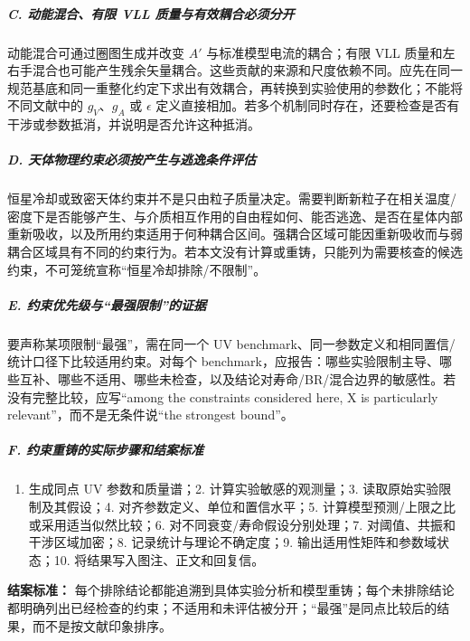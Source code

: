 \documentclass[
]{article}
\providecommand{\tightlist}{%
  \setlength{\itemsep}{0pt}\setlength{\parskip}{0pt}}
\begin{document}
\subparagraph{C. 动能混合、有限 VLL
质量与有效耦合必须分开}\label{c.-ux52a8ux80fdux6df7ux5408ux6709ux9650-vll-ux8d28ux91cfux4e0eux6709ux6548ux8026ux5408ux5fc5ux987bux5206ux5f00}

动能混合可通过圈图生成并改变 \(A'\) 与标准模型电流的耦合；有限 VLL
质量和左右手混合也可能产生残余矢量耦合。这些贡献的来源和尺度依赖不同。应先在同一规范基底和同一重整化约定下求出有效耦合，再转换到实验使用的参数化；不能将不同文献中的
\(g_V\)、\(g_A\) 或 \(\epsilon\)
定义直接相加。若多个机制同时存在，还要检查是否有干涉或参数抵消，并说明是否允许这种抵消。

\subparagraph{D.
天体物理约束必须按产生与逃逸条件评估}\label{d.-ux5929ux4f53ux7269ux7406ux7ea6ux675fux5fc5ux987bux6309ux4ea7ux751fux4e0eux9003ux9038ux6761ux4ef6ux8bc4ux4f30}

恒星冷却或致密天体约束并不是只由粒子质量决定。需要判断新粒子在相关温度/密度下是否能够产生、与介质相互作用的自由程如何、能否逃逸、是否在星体内部重新吸收，以及所用约束适用于何种耦合区间。强耦合区域可能因重新吸收而与弱耦合区域具有不同的约束行为。若本文没有计算或重铸，只能列为需要核查的候选约束，不可笼统宣称``恒星冷却排除/不限制''。

\subparagraph{E.
约束优先级与``最强限制''的证据}\label{e.-ux7ea6ux675fux4f18ux5148ux7ea7ux4e0eux6700ux5f3aux9650ux5236ux7684ux8bc1ux636e}

要声称某项限制``最强''，需在同一个 UV
benchmark、同一参数定义和相同置信/统计口径下比较适用约束。对每个
benchmark，应报告：哪些实验限制主导、哪些互补、哪些不适用、哪些未检查，以及结论对寿命/BR/混合边界的敏感性。若没有完整比较，应写``among
the constraints considered here, X is particularly
relevant''，而不是无条件说``the strongest bound''。

\subparagraph{F.
约束重铸的实际步骤和结案标准}\label{f.-ux7ea6ux675fux91cdux94f8ux7684ux5b9eux9645ux6b65ux9aa4ux548cux7ed3ux6848ux6807ux51c6}

\begin{enumerate}
\def\labelenumi{\arabic{enumi}.}
\tightlist
\item
  生成同点 UV 参数和质量谱；2. 计算实验敏感的观测量；3.
  读取原始实验限制及其假设；4. 对齐参数定义、单位和置信水平；5.
  计算模型预测/上限之比或采用适当似然比较；6.
  对不同衰变/寿命假设分别处理；7. 对阈值、共振和干涉区域加密；8.
  记录统计与理论不确定度；9. 输出适用性矩阵和参数域状态；10.
  将结果写入图注、正文和回复信。
\end{enumerate}

\textbf{结案标准：}
每个排除结论都能追溯到具体实验分析和模型重铸；每个未排除结论都明确列出已经检查的约束；不适用和未评估被分开；``最强''是同点比较后的结果，而不是按文献印象排序。
\end{document}
